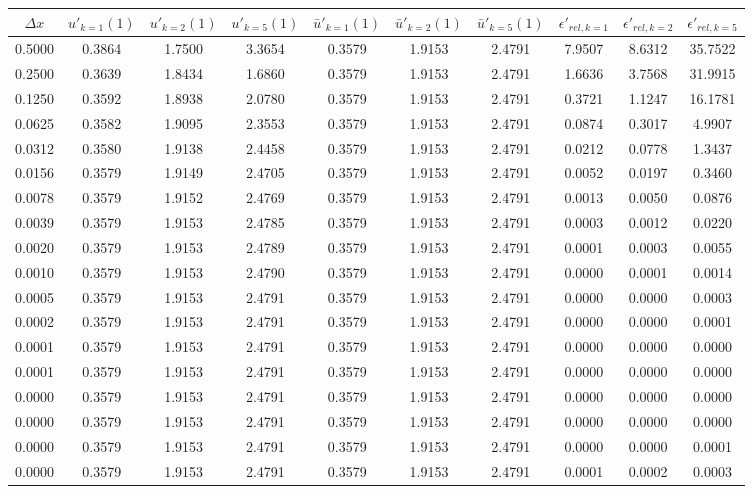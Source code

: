 \begin{tabular}{|c|c|c|c|c|c|c|c|c|c|}
\hline
\textbf{$\Delta x$}&\textbf{$u'_{k=1}(1)$}&\textbf{$u'_{k=2}(1)$}&\textbf{$u'_{k=5}(1)$}&\textbf{$\bar{u}'_{k=1}(1)$}&\textbf{$\bar{u}'_{k=2}(1)$}&\textbf{$\bar{u}'_{k=5}(1)$}&\textbf{$\epsilon'_{rel,k=1}$}&\textbf{$\epsilon'_{rel,k=2}$}&\textbf{$\epsilon'_{rel,k=5}$}\\\hline
0.5000&0.3864&1.7500&3.3654&0.3579&1.9153&2.4791&7.9507&8.6312&35.7522\\\hline
0.2500&0.3639&1.8434&1.6860&0.3579&1.9153&2.4791&1.6636&3.7568&31.9915\\\hline
0.1250&0.3592&1.8938&2.0780&0.3579&1.9153&2.4791&0.3721&1.1247&16.1781\\\hline
0.0625&0.3582&1.9095&2.3553&0.3579&1.9153&2.4791&0.0874&0.3017&4.9907\\\hline
0.0312&0.3580&1.9138&2.4458&0.3579&1.9153&2.4791&0.0212&0.0778&1.3437\\\hline
0.0156&0.3579&1.9149&2.4705&0.3579&1.9153&2.4791&0.0052&0.0197&0.3460\\\hline
0.0078&0.3579&1.9152&2.4769&0.3579&1.9153&2.4791&0.0013&0.0050&0.0876\\\hline
0.0039&0.3579&1.9153&2.4785&0.3579&1.9153&2.4791&0.0003&0.0012&0.0220\\\hline
0.0020&0.3579&1.9153&2.4789&0.3579&1.9153&2.4791&0.0001&0.0003&0.0055\\\hline
0.0010&0.3579&1.9153&2.4790&0.3579&1.9153&2.4791&0.0000&0.0001&0.0014\\\hline
0.0005&0.3579&1.9153&2.4791&0.3579&1.9153&2.4791&0.0000&0.0000&0.0003\\\hline
0.0002&0.3579&1.9153&2.4791&0.3579&1.9153&2.4791&0.0000&0.0000&0.0001\\\hline
0.0001&0.3579&1.9153&2.4791&0.3579&1.9153&2.4791&0.0000&0.0000&0.0000\\\hline
0.0001&0.3579&1.9153&2.4791&0.3579&1.9153&2.4791&0.0000&0.0000&0.0000\\\hline
0.0000&0.3579&1.9153&2.4791&0.3579&1.9153&2.4791&0.0000&0.0000&0.0000\\\hline
0.0000&0.3579&1.9153&2.4791&0.3579&1.9153&2.4791&0.0000&0.0000&0.0000\\\hline
0.0000&0.3579&1.9153&2.4791&0.3579&1.9153&2.4791&0.0000&0.0000&0.0001\\\hline
0.0000&0.3579&1.9153&2.4791&0.3579&1.9153&2.4791&0.0001&0.0002&0.0003\\\hline
\end{tabular}
